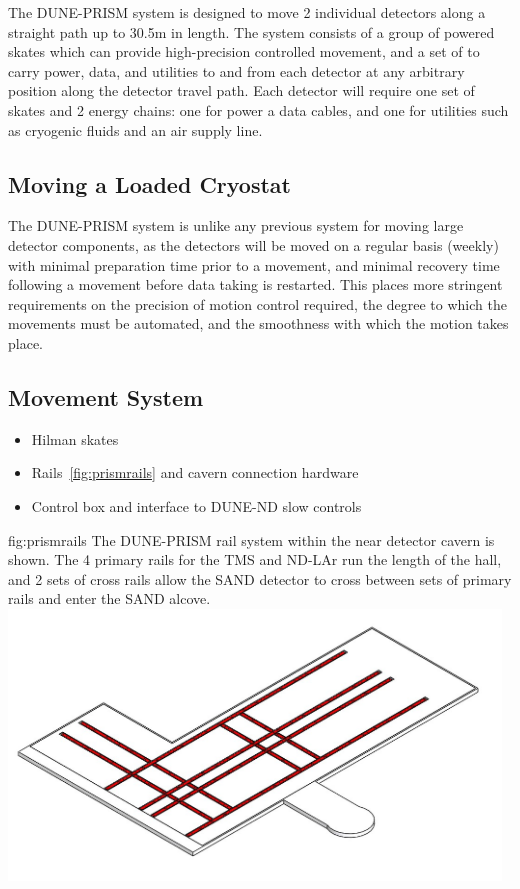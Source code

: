 The DUNE-PRISM system is designed to move 2 individual detectors along a straight path up to 30.5m in length.  The system consists of a group of powered skates which can provide high-precision controlled movement, and a set of  to carry power, data, and utilities to and from each detector at any arbitrary position along the detector travel path.  Each detector will require one set of skates and 2 energy chains: one for power a data cables, and one for utilities such as cryogenic fluids and an air supply line.

\subsection{Moving a Loaded Cryostat}
\label{sec:prism-des-move}

The DUNE-PRISM system is unlike any previous system for moving large detector components, as the detectors will be moved on a regular basis (weekly) with minimal preparation time prior to a movement, and minimal recovery time following a movement before data taking is restarted. This places more stringent requirements on the precision of motion control required, the degree to which the movements must be automated, and the smoothness with which the motion takes place. 

\subsection{Movement System}
\label{sec:prism-des-wbs1}
\begin{itemize}
    \item Hilman skates
    \item Rails~\ref{fig:prismrails} and cavern connection hardware
    \item Control box and interface to DUNE-ND slow controls
\end{itemize}

\begin{dunefigure}{fig:prismrails}
{The DUNE-PRISM rail system within the near detector cavern is shown. The 4 primary rails for the TMS and ND-LAr run the length of the hall, and 2 sets of cross rails allow the SAND detector to cross between sets of primary rails and enter the SAND alcove.}
\includegraphics[width=0.98\textwidth]{graphics/prism/prismrails.jpg}
\end{dunefigure}


